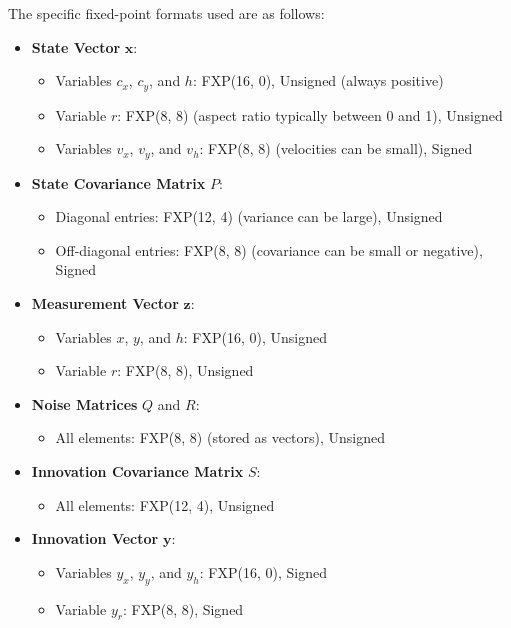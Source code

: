 The specific fixed-point formats used are as follows:

\begin{itemize}
	\item \textbf{State Vector} $\mathbf{x}$:
	\begin{itemize}
		\item Variables $c_x$, $c_y$, and $h$: FXP(16, 0), Unsigned (always positive)
		\item Variable $r$: FXP(8, 8) (aspect ratio typically between 0 and 1), Unsigned
		\item Variables $v_x$, $v_y$, and $v_h$: FXP(8, 8) (velocities can be small), Signed
	\end{itemize}
	\item \textbf{State Covariance Matrix} $P$:
	\begin{itemize}
		\item Diagonal entries: FXP(12, 4) (variance can be large), Unsigned
		\item Off-diagonal entries: FXP(8, 8) (covariance can be small or negative), Signed
	\end{itemize}
	\item \textbf{Measurement Vector} $\mathbf{z}$:
	\begin{itemize}
		\item Variables $x$, $y$, and $h$: FXP(16, 0), Unsigned
		\item Variable $r$: FXP(8, 8), Unsigned
	\end{itemize}
	\item \textbf{Noise Matrices} $Q$ and $R$:
	\begin{itemize}
		\item All elements: FXP(8, 8) (stored as vectors), Unsigned
	\end{itemize}
	\item \textbf{Innovation Covariance Matrix} $S$:
	\begin{itemize}
		\item All elements: FXP(12, 4), Unsigned
	\end{itemize}
	\item \textbf{Innovation Vector} $\mathbf{y}$:
	\begin{itemize}
		\item Variables $y_x$, $y_y$, and $y_h$: FXP(16, 0), Signed
		\item Variable $y_r$: FXP(8, 8), Signed
	\end{itemize}
\end{itemize}

